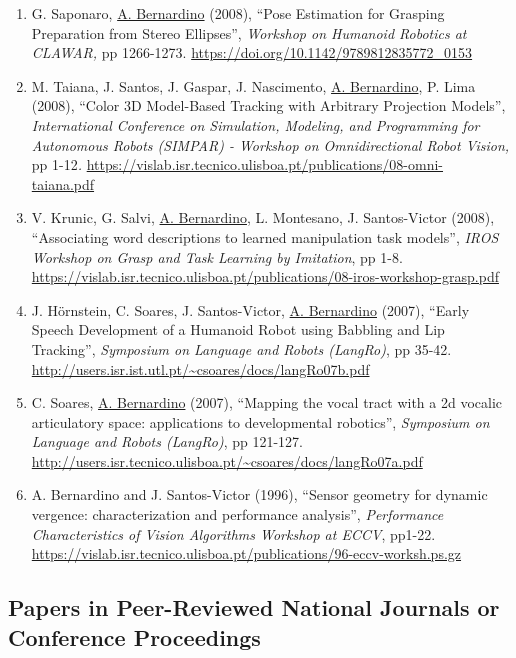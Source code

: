 \begin{enumerate}
{  Human-Robot Interaction (HRI), Late Breaking Report session,} pp
  243-244. \url{https://doi.org/10.1145/1957656.1957752}
\item
  G. Saponaro, \ul{A. Bernardino} (2008), ``Pose Estimation for Grasping
  Preparation from Stereo Ellipses'', \emph{Workshop on Humanoid
  Robotics at CLAWAR,} pp 1266-1273.
  \url{https://doi.org/10.1142/9789812835772_0153}~
\item
  M. Taiana, J. Santos, J. Gaspar, J. Nascimento, \ul{A. Bernardino}, P.
  Lima (2008), ``Color 3D Model-Based Tracking with Arbitrary Projection
  Models'', \emph{International Conference on Simulation, Modeling, and
  Programming for Autonomous Robots (SIMPAR) - Workshop on
  Omnidirectional Robot Vision,} pp 1-12\emph{.}
  \url{https://vislab.isr.tecnico.ulisboa.pt/publications/08-omni-taiana.pdf}~
\item
  V. Krunic, G. Salvi, \ul{A. Bernardino}, L. Montesano, J.
  Santos-Victor (2008), ``Associating word descriptions to learned
  manipulation task models'', \emph{IROS Workshop on Grasp and Task
  Learning by Imitation}, pp 1-8.
  \url{https://vislab.isr.tecnico.ulisboa.pt/publications/08-iros-workshop-grasp.pdf}
\item
  J. Hörnstein, C. Soares, J. Santos-Victor, \ul{A. Bernardino}
  \textbar(2007), ``Early Speech Development of a Humanoid Robot using
  Babbling and Lip Tracking'', \emph{Symposium on Language and Robots
  (LangRo)}, pp 35-42.
  \url{http://users.isr.ist.utl.pt/~csoares/docs/langRo07b.pdf}~
\item
  C. Soares, \ul{A. Bernardino} (2007), ``Mapping the vocal tract with a
  2d vocalic articulatory space: applications to developmental
  robotics'', \emph{Symposium on Language and Robots (LangRo)}, pp
  121-127.
  \url{http://users.isr.tecnico.ulisboa.pt/~csoares/docs/langRo07a.pdf}~
\item
  A. Bernardino and J. Santos-Victor (1996), ``Sensor geometry for
  dynamic vergence: characterization and performance analysis'',
  \emph{Performance Characteristics of Vision Algorithms Workshop at
  ECCV}, pp1-22.
  \url{https://vislab.isr.tecnico.ulisboa.pt/publications/96-eccv-worksh.ps.gz}
\end{enumerate}

\subsection{Papers in Peer-Reviewed National Journals or Conference
Proceedings}\label{papers-in-peer-reviewed-national-journals-or-conference-proceedings}

